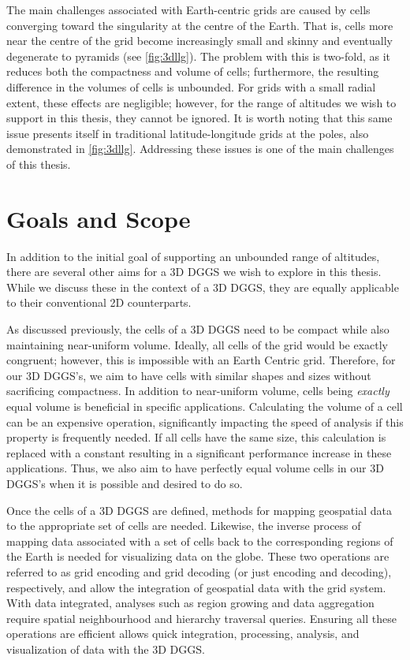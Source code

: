 The main challenges associated with Earth-centric grids are caused by cells converging toward the singularity at the centre of the Earth.
That is, cells more near the centre of the grid become increasingly small and skinny and eventually degenerate to pyramids
(see \cref{fig:3dllg}).
The problem with this is two-fold, as it reduces both the compactness and volume of cells; furthermore, the resulting difference in the volumes of cells is unbounded.
For grids with a small radial extent, these effects are negligible; however, for the range of altitudes we wish to support in this thesis, they cannot be ignored.
It is worth noting that this same issue presents itself in traditional latitude-longitude grids at the poles, also demonstrated in \cref{fig:3dllg}.
Addressing these issues is one of the main challenges of this thesis.


\section{Goals and Scope} \label{chap:1:goals}
In addition to the initial goal of supporting an unbounded range of altitudes, there are several other aims for a 3D DGGS we wish to explore in this thesis.
While we discuss these in the context of a 3D DGGS, they are equally applicable to their conventional 2D counterparts.



As discussed previously, the cells of a 3D DGGS need to be compact while also maintaining near-uniform volume.
Ideally, all cells of the grid would be exactly congruent; however, this is impossible with an Earth Centric grid.
Therefore, for our 3D DGGS's, we aim to have cells with similar shapes and sizes without sacrificing compactness.
In addition to near-uniform volume, cells being \textit{exactly} equal volume is beneficial in specific applications.
Calculating the volume of a cell can be an expensive operation, significantly impacting the speed of analysis if this property is frequently needed.
If all cells have the same size, this calculation is replaced with a constant resulting in a significant performance increase in these applications.
Thus, we also aim to have perfectly equal volume cells in our 3D DGGS's when it is possible and desired to do so.


Once the cells of a 3D DGGS are defined, methods for mapping geospatial data to the appropriate set of cells are needed.
Likewise, the inverse process of mapping data associated with a set of cells back to the corresponding regions of the Earth is needed for visualizing data on the globe.
These two operations are referred to as grid encoding and grid decoding (or just encoding and decoding), respectively, and allow the integration of geospatial data with the grid system.
With data integrated, analyses such as region growing and data aggregation require spatial neighbourhood and hierarchy traversal queries.
Ensuring all these operations are efficient allows quick integration, processing, analysis, and visualization of data with the 3D DGGS.


